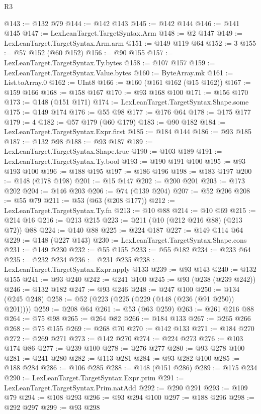 \begin{lexlean}{R3}
\begin{coremodule}
@143 := @132 @79
@144 := @142 @143
@145 := @142 @144
@146 := @141 @145
@147 := LexLeanTarget.TargetSyntax.Arm
@148 := @2 @147
@149 := LexLeanTarget.TargetSyntax.Arm.arm
@151 := @149 @119 @64
@152 := 3
@155 := @57 @152 (@60 @152)
@156 := @90 @155
@157 := LexLeanTarget.TargetSyntax.Ty.bytes
@158 := @107 @157
@159 := LexLeanTarget.TargetSyntax.Value.bytes
@160 := ByteArray.mk
@161 := List.toArray.{0}
@162 := UInt8
@166 := @160 (@161 @162 (@15 @162))
@167 := @159 @166
@168 := @158 @167
@170 := @93 @168 @100
@171 := @156 @170
@173 := @148 (@151 @171)
@174 := LexLeanTarget.TargetSyntax.Shape.some
@175 := @149 @174
@176 := @55 @98
@177 := @176 @64
@178 := @175 @177
@179 := 4
@182 := @57 @179 (@60 @179)
@183 := @90 @182
@184 := LexLeanTarget.TargetSyntax.Expr.first
@185 := @184 @144
@186 := @93 @185
@187 := @132 @98
@188 := @93 @187
@189 := LexLeanTarget.TargetSyntax.Shape.true
@190 := @103 @189
@191 := LexLeanTarget.TargetSyntax.Ty.bool
@193 := @190 @191 @100
@195 := @93 @193 @100
@196 := @188 @195
@197 := @186 @196
@198 := @183 @197
@200 := @148 (@178 @198)
@201 := @15 @147
@202 := @200 @201
@203 := @173 @202
@204 := @146 @203
@206 := @74 (@139 @204)
@207 := @52 @206
@208 := @55 @79
@211 := @53 (@63 (@208 @177))
@212 := LexLeanTarget.TargetSyntax.Ty.fn
@213 := @10 @88
@214 := @10 @69
@215 := @214 @16
@216 := @213 @215
@223 := @211 (@10 (@212 @216 @88) (@213 @72)) @88
@224 := @140 @88
@225 := @224 @187
@227 := @149 @114 @64
@229 := @148 (@227 @143)
@230 := LexLeanTarget.TargetSyntax.Shape.cons
@231 := @149 @230
@232 := @55 @155
@233 := @55 @182
@234 := @233 @64
@235 := @232 @234
@236 := @231 @235
@238 := LexLeanTarget.TargetSyntax.Expr.apply @133
@239 := @93 @143
@240 := @132 @155
@241 := @93 @240
@242 := @241 @100
@245 := @93 (@238 (@239 @242))
@246 := @132 @182
@247 := @93 @246
@248 := @247 @100
@250 := @134 (@245 @248)
@258 := @52 (@223 (@225 (@229 (@148 (@236 (@91 @250)) @201))))
@259 := @208 @64
@261 := @53 (@63 @259)
@263 := @261 @216 @88
@264 := @75 @98
@265 := @264 @82
@266 := @184 @133
@267 := @265 @266
@268 := @75 @155
@269 := @268 @70
@270 := @142 @133
@271 := @184 @270
@272 := @269 @271
@273 := @142 @270
@274 := @224 @273
@276 := @103 @174 @86
@277 := @239 @100
@278 := @276 @277
@280 := @93 @278 @100
@281 := @241 @280
@282 := @113 @281
@284 := @93 @282 @100
@285 := @188 @284
@286 := @106 @285
@288 := @148 (@151 @286)
@289 := @175 @234
@290 := LexLeanTarget.TargetSyntax.Expr.prim
@291 := LexLeanTarget.TargetSyntax.Prim.natAdd
@292 := @290 @291
@293 := @109 @79
@294 := @108 @293
@296 := @93 @294 @100
@297 := @188 @296
@298 := @292 @297
@299 := @93 @298

\end{coremodule}
\end{lexlean}
